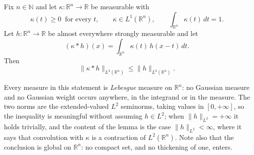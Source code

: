\begin{lemma}
Fix $n \in \mathbb{N}$ and let $\kappa : \mathbb{R}^n \to \mathbb{R}$ be
measurable with
\[
  \kappa(t) \geq 0 \ \text{ for every } t, \qquad
  \kappa \in L^1(\mathbb{R}^n), \qquad
  \int_{\mathbb{R}^n} \kappa(t)\, dt = 1 .
\]
Let $h : \mathbb{R}^n \to \mathbb{R}$ be almost everywhere strongly measurable and
let
\[
  (\kappa * h)(x) = \int_{\mathbb{R}^n} \kappa(t)\, h(x-t)\, dt .
\]
Then
\[
  \|\kappa * h\|_{L^2(\mathbb{R}^n)} \leq \|h\|_{L^2(\mathbb{R}^n)} .
\]

Every measure in this statement is \emph{Lebesgue} measure on $\mathbb{R}^n$: no
Gaussian measure and no Gaussian weight occurs anywhere, in the integrand or in
the measure.  The two norms are the extended-valued $L^2$ seminorms, taking values
in $[0,+\infty]$, so the inequality is meaningful without assuming $h \in L^2$;
when $\|h\|_{L^2} = +\infty$ it holds trivially, and the content of the lemma is
the case $\|h\|_{L^2} < \infty$, where it says that convolution with $\kappa$ is a
contraction of $L^2(\mathbb{R}^n)$.  Note also that the conclusion is global on
$\mathbb{R}^n$: no compact set, and no thickening of one, enters.
\end{lemma}
